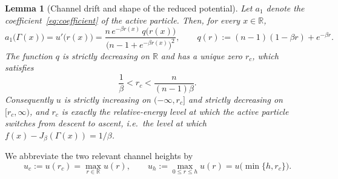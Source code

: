 \documentclass{article}
\theoremstyle{plain}
\newtheorem{lemma}[theorem]{Lemma}
\theoremstyle{definition}
\theoremstyle{remark}
\newcommand{\R}{\mathbb{R}}
\begin{document}
\begin{lemma}[Channel drift and shape of the reduced potential]
\label{lem:channel-drift}
Let \(a_1\) denote the coefficient~\eqref{eq:coefficient} of the active particle. Then, for every \(x\in\R\),
\begin{equation}
    a_1\bigl(\Gamma(x)\bigr)=u'\bigl(r(x)\bigr)
    =\frac{n\,e^{-\beta r(x)}\,q\bigl(r(x)\bigr)}{\bigl(n-1+e^{-\beta r(x)}\bigr)^{2}},
    \qquad
    q(r):=(n-1)(1-\beta r)+e^{-\beta r}.
    \label{eq:a1-equals-uprime}
\end{equation}
The function \(q\) is strictly decreasing on \(\R\) and has a unique zero \(r_c\), which satisfies
\begin{equation}
    \frac1\beta<r_c<\frac{n}{(n-1)\beta}.
    \label{eq:rc-location}
\end{equation}
Consequently \(u\) is strictly increasing on \((-\infty,r_c]\) and strictly decreasing on \([r_c,\infty)\), and \(r_c\) is exactly the relative-energy level at which the active particle switches from descent to ascent, i.e.\ the level at which \(f(x)-J_\beta(\Gamma(x))=1/\beta\).
\end{lemma}

We abbreviate the two relevant channel heights by
\begin{equation}
    u_c:=u(r_c)=\max_{r\in\R}u(r),
    \qquad
    u_h:=\max_{0\le r\le h}u(r)=u\bigl(\min\{h,r_c\}\bigr).
    \label{eq:channel-heights}
\end{equation}
 
\end{document}
